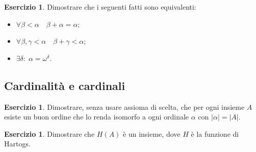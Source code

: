 \documentclass[a4paper,10pt,oneside]{article}
\newcommand{\abs}[1]{\left|#1\right|}
\theoremstyle{plain}
\theoremstyle{definition}
\newtheorem{myex}[mytheorem]{Esercizio}
\theoremstyle{remark}
\begin{document}
\begin{myex} Dimostrare che i seguenti fatti sono equivalenti:
\begin{itemize}
 \item $\forall \beta < \alpha \quad \beta + \alpha=\alpha$;
 \item $\forall \beta,\gamma <\alpha \quad \beta +\gamma <\alpha$;
 \item $\exists \delta: \; \alpha=\omega^\delta$.
\end{itemize}
\end{myex}

\subsection{Cardinalità e cardinali}
\begin{myex}
 Dimostrare, senza usare assioma di scelta, che per ogni insieme $A$ esiste un buon ordine che lo renda isomorfo a ogni ordinale $\alpha$ con $\abs\alpha=\abs A$.
\end{myex}
\begin{myex}\label{ex:Hart}
 Dimostrare che $H(A)$ è un insieme, dove $H$ è la funzione di Hartogs.
\end{myex}
 
\end{document}
